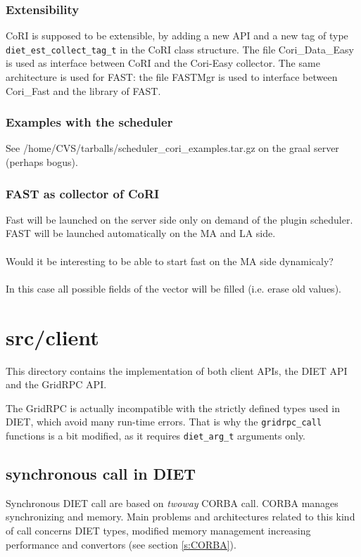   \subsubsection{Extensibility}
  CoRI is supposed to be extensible, by adding a new API and a new tag
  of type \texttt{diet\_est\_collect\_tag\_t} in the
  CoRI class structure.
  The file \textsf{Cori\_Data\_Easy} is used as interface between
  CoRI and the Cori-Easy collector. The same architecture is used for FAST: the file
  \textsf{FASTMgr} is used to interface between Cori\_Fast and the library of
  FAST.
 \subsubsection{Examples  with the scheduler}
 See /home/CVS/tarballs/scheduler\_cori\_examples.tar.gz  on the graal server (perhaps bogus).
 \subsubsection{FAST as collector of CoRI}
 Fast will be launched on the server side only on demand of the plugin scheduler.
 FAST will be launched automatically on the MA and LA side.\\
 \\ Would it be interesting to be able to start fast on the MA side dynamicaly?\\
\\ 
In this case all possible fields of the vector will be filled (i.e. erase old values).

  \section{\textsf{src/client}}
  \label{s:client}

  This directory contains the implementation of both client APIs, the DIET API and
  the GridRPC API.

  The GridRPC is actually incompatible with the strictly defined types used in
  DIET, which avoid many run-time errors. That is why the \texttt{gridrpc\_call}
  functions is a bit modified, as it requires \texttt{diet\_arg\_t} arguments
  only.



  \subsection{synchronous call in DIET}
  Synchronous DIET call are based on \emph{twoway} CORBA call. CORBA manages synchronizing
  and memory. Main problems and architectures related to this kind of call concerns
  DIET types, modified memory management increasing performance and convertors (see section \ref{s:CORBA}).

